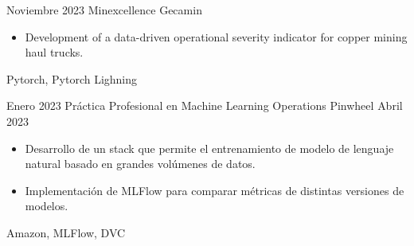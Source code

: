 
\begin{projects}

	\project
	{Noviembre 2023}
	{Minexcellence}
	{Gecamin}
	{}
	{
		\begin{itemize}
			\item Development of a data-driven operational severity indicator for copper mining haul trucks.
		\end{itemize}
	}
	{
		Pytorch,
		Pytorch Lighning
	}

	\emptySeparator

	\project
	{Enero 2023}
	{Práctica Profesional en Machine Learning Operations}
	{Pinwheel}
	{Abril 2023}
	{
		\begin{itemize}
			\item Desarrollo de un stack que permite el entrenamiento de modelo de lenguaje natural basado en grandes volúmenes de datos.
			\item Implementación de MLFlow para comparar métricas de distintas versiones de modelos.
		\end{itemize}
	}
	{
		Amazon,
		MLFlow,
		DVC
	}

\end{projects}